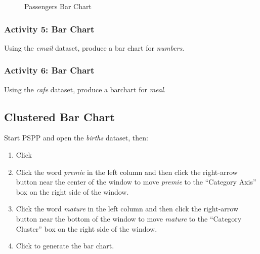 \begin{figure}[H]
  \begin{center}
    \caption{Passengers Bar Chart}
    \label{lab02_fig18}
  \end{center}
\end{figure}

\subsubsection{Activity 5: Bar Chart} \label{lab02_act05}

Using the \textit{email} dataset, produce a bar chart for \textit{numbers}.

\subsubsection{Activity 6: Bar Chart} \label{lab02_act06}

Using the \textit{cafe} dataset, produce a barchart for \textit{meal}.

\subsection{Clustered Bar Chart}

Start \acs{PSPP} and open the \textit{births} dataset, then:

\begin{enumerate}
  \item Click \textsc{}
  \item Click the word \textit{premie} in the left column and then click the right-arrow button near the center of the window to move \textit{premie} to the ``Category Axis'' box on the right side of the window.
  \item Click the word \textit{mature} in the left column and then click the right-arrow button near the bottom of the window to move \textit{mature} to the ``Category Cluster'' box on the right side of the window.
  \item Click  to generate the bar chart.
\end{enumerate}


